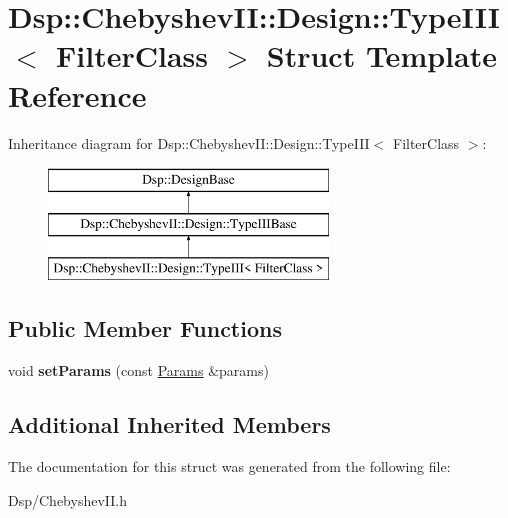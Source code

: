 \hypertarget{structDsp_1_1ChebyshevII_1_1Design_1_1TypeIII}{\section{Dsp\-:\-:Chebyshev\-I\-I\-:\-:Design\-:\-:Type\-I\-I\-I$<$ Filter\-Class $>$ Struct Template Reference}
\label{structDsp_1_1ChebyshevII_1_1Design_1_1TypeIII}
}
Inheritance diagram for Dsp\-:\-:Chebyshev\-I\-I\-:\-:Design\-:\-:Type\-I\-I\-I$<$ Filter\-Class $>$\-:\begin{figure}[H]
\begin{center}
\leavevmode
\includegraphics[height=3.000000cm]{structDsp_1_1ChebyshevII_1_1Design_1_1TypeIII}
\end{center}
\end{figure}
\subsection*{Public Member Functions}
\begin{DoxyCompactItemize}
\item 
\hypertarget{structDsp_1_1ChebyshevII_1_1Design_1_1TypeIII_abb384ec1a453021ecd9e7eed31639005}{void {\bfseries set\-Params} (const \hyperlink{structDsp_1_1Params}{Params} \&params)}\label{structDsp_1_1ChebyshevII_1_1Design_1_1TypeIII_abb384ec1a453021ecd9e7eed31639005}

\end{DoxyCompactItemize}
\subsection*{Additional Inherited Members}


The documentation for this struct was generated from the following file\-:\begin{DoxyCompactItemize}
\item 
Dsp/Chebyshev\-I\-I.\-h\end{DoxyCompactItemize}
